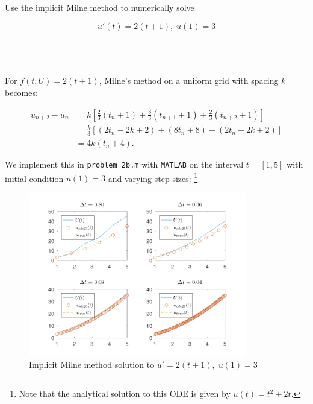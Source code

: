 Use the implicit Milne method to numerically solve

$$
u'(t) = 2(t + 1),\; u(1) = 3
$$

\begin{solution}\ \\\\
    \ \\
    For $f(t, U) = 2(t + 1)$, Milne's method on a uniform grid with spacing $k$ becomes:
    
    \begin{align*}
        u_{n+2} - u_n &= k \left[ \frac{2}{3}(t_n + 1) + \frac{8}{3}(t_{n+1} + 1) + \frac{2}{3}(t_{n+2} + 1) \right] \\
                      &= \frac{k}{3} \left[ (2t_n - 2k + 2) + (8t_n + 8) + (2t_n + 2k + 2) \right] \\
                      &= 4k(t_n + 4).
    \end{align*}
    
    We implement this in \texttt{problem\_2b.m} with \texttt{MATLAB} on the interval $t = [1, 5]$ with initial condition 
    $u(1) = 3$ and varying step sizes: \footnote{
        Note that the analytical solution to this ODE is given by $u(t) = t^2 + 2t$.
    }
    
    \begin{figure}[h]
        \centering
        \includegraphics[width=0.85\textwidth]{problem_2b_solution.png}
        \caption[problem2b_solution]{Implicit Milne method solution to $u' = 2(t+1),\; u(1) = 3$}
    \end{figure}
\end{solution}